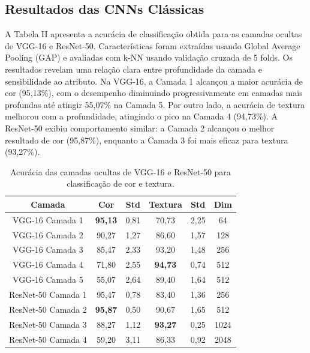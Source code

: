\documentclass[conference]{IEEEtran}
\begin{document}
\subsection{Resultados das CNNs Cl\'{a}ssicas}

A Tabela II apresenta a acur\'{a}cia de classifica\c{c}\~{a}o obtida para as camadas ocultas de VGG-16 e ResNet-50. Caracter\'{i}sticas foram extra\'{i}das usando Global Average Pooling (GAP) e avaliadas com k-NN usando valida\c{c}\~{a}o cruzada de 5 folds. Os resultados revelam uma rela\c{c}\~{a}o clara entre profundidade da camada e sensibilidade ao atributo. Na VGG-16, a Camada 1 alcan\c{c}ou a maior acur\'{a}cia de cor (95,13\%), com o desempenho diminuindo progressivamente em camadas mais profundas at\'{e} atingir 55,07\% na Camada 5. Por outro lado, a acur\'{a}cia de textura melhorou com a profundidade, atingindo o pico na Camada 4 (94,73\%). A ResNet-50 exibiu comportamento similar: a Camada 2 alcan\c{c}ou o melhor resultado de cor (95,87\%), enquanto a Camada 3 foi mais eficaz para textura (93,27\%).

\begin{table}[htbp]
\caption{Acur\'{a}cia das camadas ocultas de VGG-16 e ResNet-50 para classifica\c{c}\~{a}o de cor e textura.}
\begin{center}
\begin{tabular}{|c|c|c|c|c|c|}
\hline
\textbf{Camada} & \textbf{Cor} & \textbf{Std} & \textbf{Textura} & \textbf{Std} & \textbf{Dim}\\
\hline
VGG-16 Camada 1 & \textbf{95,13} & 0,81 & 70,73 & 2,25 & 64 \\
\hline
VGG-16 Camada 2 & 90,27 & 1,27 & 86,60 & 1,57 & 128 \\
\hline
VGG-16 Camada 3 & 85,47 & 2,33 & 93,20 & 1,48 & 256 \\
\hline
VGG-16 Camada 4 & 71,80 & 2,55 & \textbf{94,73} & 0,74 & 512 \\
\hline
VGG-16 Camada 5 & 55,07 & 2,64 & 89,40 & 1,64 & 512 \\
\hline
ResNet-50 Camada 1 & 95,47 & 0,78 & 83,40 & 1,36 & 256 \\
\hline
ResNet-50 Camada 2 & \textbf{95,87} & 0,50 & 90,67 & 1,65 & 512 \\
\hline
ResNet-50 Camada 3 & 88,27 & 1,12 & \textbf{93,27} & 0,25 & 1024 \\
\hline
ResNet-50 Camada 4 & 59,20 & 3,11 & 86,33 & 0,92 & 2048 \\
\hline
\end{tabular}
\label{tab2}
\end{center}
\end{table}
\end{document}

